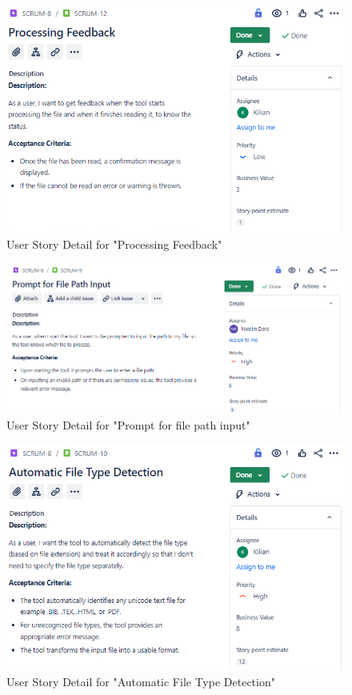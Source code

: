 \begin{figure}[h!]
    \centering
    \includegraphics[width=1\textwidth]{pictures/Scrum/Sprint 1/UserStory_4}
    \caption{User Story Detail for "Processing Feedback"}
    \label{fig:sprint_1_userstory_1}
\end{figure}
\begin{figure}[h!]
    \centering
    \includegraphics[width=1\textwidth]{pictures/Scrum/Sprint 1/UserStory_1}
    \caption{User Story Detail for "Prompt for file path input"}
    \label{fig:sprint_1_userstory_2}
\end{figure}
\begin{figure}[h!]
    \centering
    \includegraphics[width=1\textwidth]{pictures/Scrum/Sprint 1/UserStory_2}
    \caption{User Story Detail for "Automatic File Type Detection"}
    \label{fig:sprint_1_userstory_3}
\end{figure}
